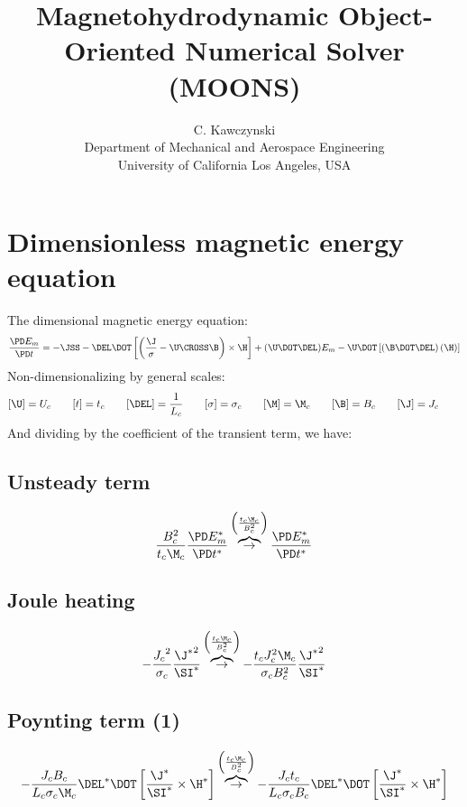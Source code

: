 \documentclass[11pt]{article}
\newcommand{\OB}{\overbrace{\rightarrow}^{\left(\frac{t_c \M_c}{B_c^2}\right)}}
\begin{document}
\doublespacing
\title{Magnetohydrodynamic Object-Oriented Numerical Solver (MOONS)}
\author{C. Kawczynski \\
Department of Mechanical and Aerospace Engineering \\
University of California Los Angeles, USA\\
}
\maketitle

\section{Dimensionless magnetic energy equation}
The dimensional magnetic energy equation:
\begin{equation}
	\frac{\PD E_m}{\PD t} =
	- \JSS
	- \DEL \DOT \left[\left(\frac{\J}{\sigma} - \U \CROSS \B \right) \times \H \right]
	+ (\U \DOT \DEL) E_m
	- \U \DOT \left[(\B \DOT \DEL) \left( \H \right) \right]
\end{equation}
Non-dimensionalizing by general scales:
\begin{equation}\begin{aligned}
	[\U] = U_c \qquad
	[t] = t_c \qquad
	[\DEL] = \frac{1}{L_c} \qquad
	[\sigma] = \sigma_c \qquad
	[\M] = \M_c \qquad
	[\B] = B_c \qquad
	[\J] = J_c \qquad
\end{aligned}\end{equation}
And dividing by the coefficient of the transient term, we have:
\subsection{Unsteady term}
\begin{equation}
	\frac{B_c^2}{t_c \M_c} \frac{\PD E_m^*}{\PD t^*}
	\OB
	\frac{\PD E_m^*}{\PD t^*}
\end{equation}
\subsection{Joule heating}
\begin{equation}
	- \frac{{J_c}^2}{\sigma_c} \frac{{\J^*}^2}{\SI^*}
	\OB
	- \frac{t_c J_c^2 \M_c}{\sigma_c B_c^2} \frac{{\J^*}^2}{\SI^*}
\end{equation}
\subsection{Poynting term (1)}
\begin{equation}
	- \frac{J_c B_c}{L_c \sigma_c \M_c} \DEL^* \DOT \left[\frac{\J^*}{\SI^*} \times \H^* \right]
	\OB
	- \frac{J_c t_c}{L_c \sigma_c B_c} \DEL^* \DOT \left[\frac{\J^*}{\SI^*} \times \H^* \right]
\end{equation}
\end{document}

